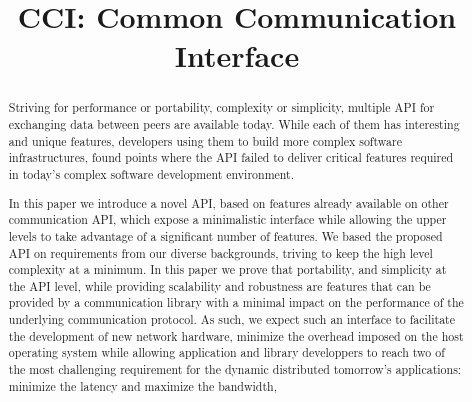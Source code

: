 \documentclass[conference]{IEEEtran}
\begin{document}
%
\title{CCI: Common Communication Interface}
% 
\author{\newline
  }

\maketitle

\begin{abstract}
  Striving for performance or portability, complexity or simplicity,
  multiple API for exchanging data between peers are available
  today. While each of them has interesting and unique features,
  developers using them to build more complex software
  infrastructures, found points where the API failed to
  deliver critical features required in today's complex software
  development environment. 

  In this paper we introduce a novel API, based on features already
  available on other communication API, which expose a minimalistic
  interface while allowing the upper levels to take advantage of a
  significant number of features. We based the proposed API on
  requirements from our diverse backgrounds, triving to keep the high
  level complexity at a minimum. In this paper we prove that
  portability, and simplicity at the API level, while providing
  scalability and robustness are features that can be provided by a
  communication library with a minimal impact on the performance of
  the underlying communication protocol. As such, we expect such an
  interface to facilitate the development of new network hardware,
  minimize the overhead imposed on the host operating system while
  allowing application and library developpers to reach two of the
  most challenging requirement for the dynamic distributed tomorrow's
  applications: minimize the latency and maximize the bandwidth,

\end{abstract}
\end{document}
